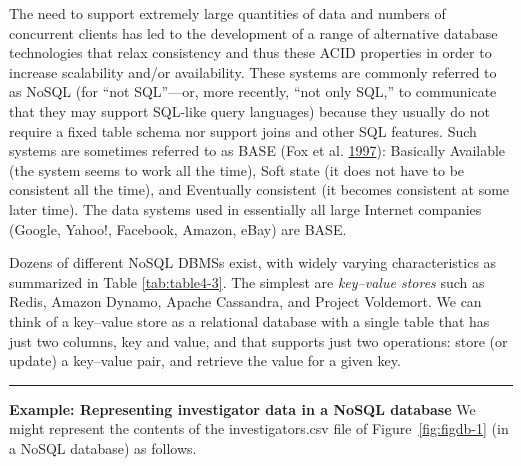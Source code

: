 \documentclass[]{krantz}
\begin{document}
The need to support extremely large quantities of data and numbers of
concurrent clients has led to the development of a range of alternative
database technologies that relax consistency and thus these ACID
properties in order to increase scalability and/or availability. These
systems are commonly referred to as NoSQL (for ``not SQL''---or, more
recently, ``not only SQL,'' to communicate that they may support
SQL-like query languages) because they usually do not require a fixed
table schema nor support joins and other SQL features. Such systems are
sometimes referred to as BASE (Fox et al.
\protect\hyperlink{ref-fox1997cluster}{1997}): Basically Available (the
system seems to work all the time), Soft state (it does not have to be
consistent all the time), and Eventually consistent (it becomes
consistent at some later time). The data systems used in essentially all
large Internet companies (Google, Yahoo!, Facebook, Amazon, eBay) are
BASE.

Dozens of different NoSQL DBMSs exist, with widely varying
characteristics as summarized in Table \ref{tab:table4-3}. The simplest
are \emph{key--value stores} such as Redis, Amazon Dynamo, Apache
Cassandra, and Project Voldemort. We can think of a key--value store as
a relational database with a single table that has just two columns, key
and value, and that supports just two operations: store (or update) a
key--value pair, and retrieve the value for a given key.

\begin{center}\rule{0.5\linewidth}{\linethickness}\end{center}

\textbf{Example: Representing investigator data in a NoSQL database} We
might represent the contents of the investigators.csv file of
Figure~\ref{fig:figdb-1} (in a NoSQL database) as follows.
\end{document}
